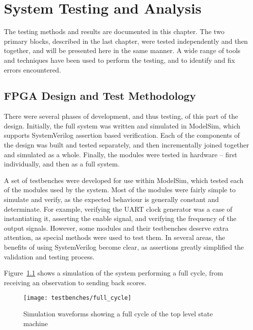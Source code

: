\chapter{System Testing and Analysis} %
\label{cha:system_testing}


The testing methods and results are documented in this chapter.  The two primary blocks, described in the last chapter, were tested independently and then together, and will be presented here in the same manner.  A wide range of tools and techniques have been used to perform the testing, and to identify and fix errors encountered.


\section{FPGA Design and Test Methodology} %
\label{sec:fpga_design_and_test_methodology}
	There were several phases of development, and thus testing, of this part of the design.  Initially, the full system was written and simulated in ModelSim, which supports SystemVerilog assertion based verification.  Each of the components of the design was built and tested separately, and then incrementally joined together and simulated as a whole.  Finally, the modules were tested in hardware -- first individually, and then as a full system.

	A set of testbenches were developed for use within ModelSim, which tested each of the modules used by the system.  Most of the modules were fairly simple to simulate and verify, as the expected behaviour is generally constant and determinate.  For example, verifying the UART clock generator was a case of instantiating it, asserting the enable signal, and verifying the frequency of the output signals.  However, some modules and their testbenches deserve extra attention, as special methods were used to test them.  In several areas, the benefits of using SystemVerilog become clear, as assertions greatly simplified the validation and testing process.

	Figure~\ref{fig:full_cycle} shows a simulation of the system performing a full cycle, from receiving an observation to sending back scores.
	\begin{figure}[tb]
		\begin{center}
			\texttt{[image: testbenches/full\_cycle]}
		\end{center}
		\caption{Simulation waveforms showing a full cycle of the top level state machine}
		\label{fig:full_cycle}
	\end{figure}


